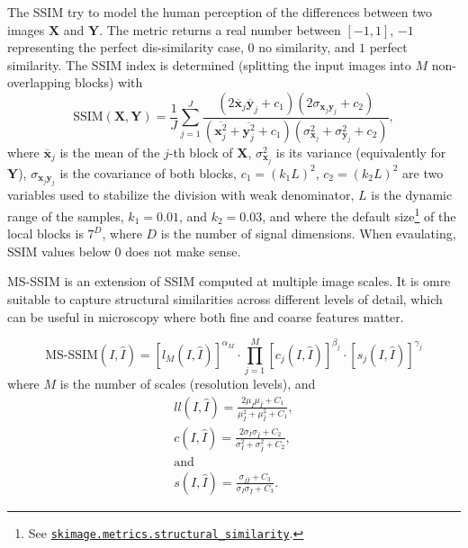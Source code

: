 \documentclass{article}
\begin{document}
The SSIM try to model the human perception of the differences between
two images $\mathbf{X}$ and $\mathbf{Y}$. The metric returns a real
number between $[-1, 1]$, $-1$ representing the perfect dis-similarity
case, $0$ no similarity, and $1$ perfect similarity. The SSIM index is
determined (splitting the input images into $M$ non-overlapping blocks)
with
\begin{equation}
  \text{SSIM}(\mathbf{X}, \mathbf{Y}) = \frac{1}{J} \sum_{j=1}^J \frac{(2\overline{\mathbf{x}}_j \overline{\mathbf{y}}_j + c_1)(2\sigma_{\mathbf{x}_j \mathbf{y}_j} + c_2)}{(\overline{\mathbf{x}_j^2} + \overline{\mathbf{y}_j^2} + c_1)(\sigma^2_{\mathbf{x}_j} + \sigma^2_{\mathbf{y}_j} + c_2)},
\end{equation}
where $\overline{\mathbf x}_j$ is the mean of the $j$-th block of
$\mathbf{X}$, $\sigma^2_{\mathbf{x}_j}$ is its variance (equivalently
for $\mathbf{Y}$), $\sigma_{\mathbf{x}_j\mathbf{y}_j}$ is the
covariance of both blocks, $c_1=(k_1L)^2$, $c_2=(k_2L)^2$ are two
variables used to stabilize the division with weak denominator, $L$ is
the dynamic range of the samples, $k_1=0.01$, and $k_2=0.03$, and
where the default
size\footnote{See \href{https://scikit-image.org/docs/stable/api/skimage.metrics.html\#skimage.metrics.structural_similarity}{\texttt{skimage.metrics.structural\_similarity}}.}
of the local blocks is $7^D$, where $D$ is the number of signal
dimensions. When evaulating, SSIM values below $0$ does not make
sense.

MS-SSIM is an extension of SSIM computed at multiple image scales. It
is omre suitable to capture structural similarities across different
levels of detail, which can be useful in microscopy where both fine
and coarse features matter.

\begin{equation}
  \text{MS-SSIM}(I, \hat{I}) = \left[ l_M(I, \hat{I}) \right]^{\alpha_M} \cdot \prod_{j=1}^{M} \left[ c_j(I, \hat{I}) \right]^{\beta_j} \cdot \left[ s_j(I, \hat{I}) \right]^{\gamma_j}
\end{equation}
where $M$ is the number of scales (resolution levels), and
\begin{align}{l}
  l(I, \hat{I}) = \frac{2 \mu_I \mu_{\hat{I}} + C_1}{\mu_I^2 + \mu_{\hat{I}}^2 + C_1},\\
  c(I, \hat{I}) = \frac{2 \sigma_I \sigma_{\hat{I}} + C_2}{\sigma_I^2 + \sigma_{\hat{I}}^2 + C_2},\\
  \text{and}\\
  s(I, \hat{I}) = \frac{\sigma_{I\hat{I}} + C_3}{\sigma_I \sigma_{\hat{I}} + C_3}.
\end{align}
\end{document}

